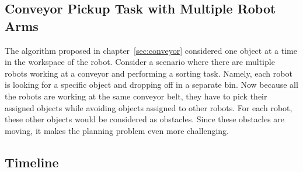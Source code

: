 \documentclass[a4paper,10pt]{article}
\begin{document}
\subsection{Conveyor Pickup Task with Multiple Robot Arms}
The algorithm proposed in chapter~\ref{sec:conveyor} considered one object at a time in the workspace of the robot. Consider a scenario where there are multiple robots working at a conveyor and performing a sorting task. Namely, each robot is looking for a specific object and dropping off in a separate bin. Now because all the robots are working at the same conveyor belt, they have to pick their assigned objects while avoiding objects assigned to other robots. For each robot, these other objects would be considered as obstacles. Since these obstacles are moving, it makes the planning problem even more challenging.

\subsection{Timeline}




\newpage



\end{document}
